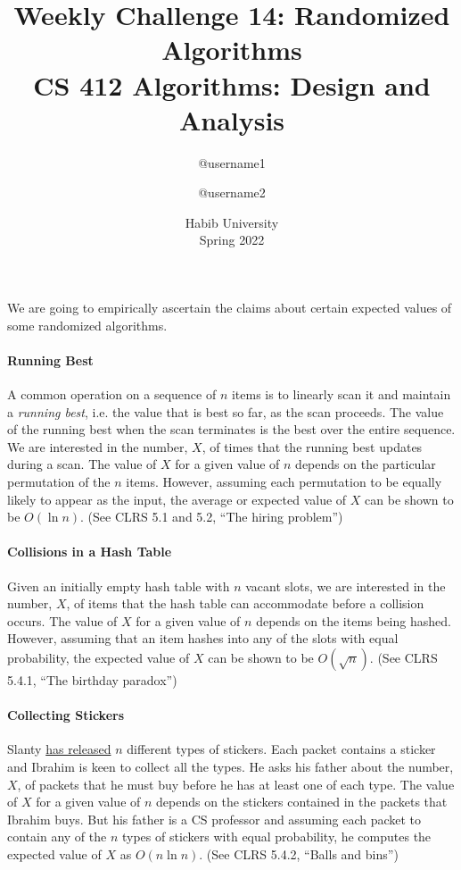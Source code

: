\documentclass[a4paper]{exam}
\title{Weekly Challenge 14: Randomized Algorithms\\CS 412 Algorithms: Design and Analysis}
\author{@username1 \and @username2}  %
\date{Habib University\\Spring 2022}
\begin{document}
\maketitle

\begin{questions}
  
\question[2] We are going to empirically ascertain the claims about certain expected values of some randomized algorithms.

  \paragraph{Running Best} A common operation on a sequence of $n$ items is to linearly scan it and maintain a \textit{running best}, i.e. the value that is best so far, as the scan proceeds. The value of the running best when the scan terminates is the best over the entire sequence. We are interested in the number, $X$, of times that the running best updates during a scan. The value of $X$ for a given value of $n$ depends on the particular permutation of the $n$ items. However, assuming each permutation to be equally likely to appear as the input, the average or expected value of $X$ can be shown to be $O(\ln n)$. (See CLRS 5.1 and 5.2, ``The hiring problem'')

  \paragraph{Collisions in a Hash Table} Given an initially empty hash table with $n$ vacant slots, we are interested in the number, $X$, of items that the hash table can accommodate before a collision occurs. The value of $X$ for a given value of $n$ depends on the items being hashed. However, assuming that an item hashes into any of the slots with equal probability, the expected value of $X$ can be shown to be $O(\sqrt{n})$. (See CLRS 5.4.1, ``The birthday paradox'')

  \paragraph{Collecting Stickers} Slanty \href{https://www.facebook.com/slantypakistan/photos/dont-let-the-stickers-run-out-collect-them-allshare-with-us-your-collection-and-/800854163429315/}{has released} $n$ different types of stickers. Each packet contains a sticker and Ibrahim is keen to collect all the types. He asks his father about the number, $X$, of packets that he must buy before he has at least one of each type. The value of $X$ for a given value of $n$ depends on the stickers contained in the packets that Ibrahim buys. But his father is a CS professor and assuming each packet to contain any of the $n$ types of stickers with equal probability, he computes the expected value of $X$ as $O(n\ln n)$. (See CLRS 5.4.2, ``Balls and bins'')


\end{questions}
\end{document}

